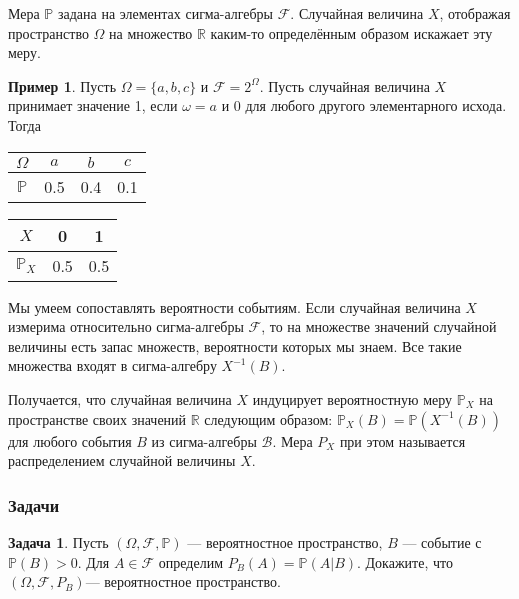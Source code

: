 \documentclass[pdftex, 12pt, a4paper]{article}
\def \mbb{\mathbb}
\def \PP{\mbb{P}}
\def\R{\ensuremath{\mathbb{R}}} %
\def\F{\ensuremath{\mathcal{F}}} %
\def\B{\ensuremath{\mathcal{B}}} %
\def \Om{\Omega}
\def \om{\omega}
\theoremstyle{definition} %
\newtheorem{myex}{Пример}
\newtheorem{problem}{Задача}
\numberwithin{problem}{section}
\numberwithin{blits}{section}
\begin{document}
Мера $\PP$ задана на элементах сигма-алгебры $\F$. Случайная величина $X$, отображая пространство $\Om$ на множество $\R$ каким-то определённым образом искажает эту меру. 

\begin{myex}
Пусть $\Om = \{a,b,c\}$ и $\F = 2^{\Om}$. Пусть случайная величина $X$ принимает значение 1, если $\om = a$ и 0 для любого другого элементарного исхода. Тогда  

\begin{multicols}{2}
\begin{table}[H]
\begin{center}
\begin{tabular}{|c|c|c|c|}
\hline
$\Om$ & $a$ & $b$ & $c$  \\
\hline
$\PP$ & 0.5 & 0.4 & 0.1  \\
\hline
\end{tabular}
\end{center}
\end{table} 
\begin{table}[H]
\begin{center}
\begin{tabular}{|c|c|c|}
\hline
$X$ & 0 & 1   \\
\hline
$\PP_X$ & 0.5 & 0.5  \\
\hline
\end{tabular}
\end{center}
\end{table} 
\end{multicols}
\end{myex}

Мы умеем сопоставлять вероятности событиям. Если случайная величина $X$ измерима относительно сигма-алгебры $\F$, то на множестве значений случайной величины есть запас множеств, вероятности которых мы знаем. Все такие множества входят в сигма-алгебру $X^{-1}(B)$.

Получается, что случайная величина $X$ индуцирует вероятностную меру $\PP_X$ на пространстве своих значений $\R$ следующим образом: $\PP_X(B) = \PP(X^{-1}(B))$ для любого события $B$ из сигма-алгебры $\B$. Мера $P_X$ при этом называется распределением случайной величины $X$. 






\subsubsection{Задачи}
\begin{problem}
Пусть $(\Om,\F,\PP)$ --- вероятностное пространство, $B$ --- событие с $\PP(B) > 0$. Для $A \in \F$ определим $P_{B}(A) = \PP(A|B)$. Докажите, что $(\Om, \F, P_{B})$--- вероятностное пространство.
\begin{sol}

\end{sol}
\end{problem}
\end{document}
